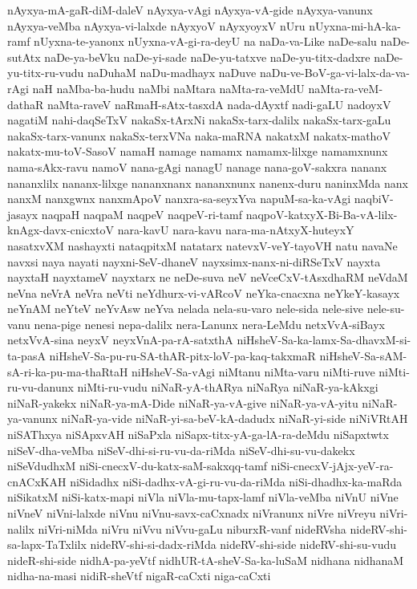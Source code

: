 {nAyxya-mA-gaR-diM-daleV
nAyxya-vAgi
nAyxya-vA-gide
nAyxya-vanunx
nAyxya-veMba
nAyxya-vi-lalxde
nAyxyoV
nAyxyoyxV
nUru
nUyxna-mi-hA-ka-ramf
nUyxna-te-yanonx
nUyxna-vA-gi-ra-deyU
na
naDa-va-Like
naDe-salu
naDe-sutAtx
naDe-ya-beVku
naDe-yi-sade
naDe-yu-tatxve
naDe-yu-titx-dadxre
naDe-yu-titx-ru-vudu
naDuhaM
naDu-madhayx
naDuve
naDu-ve-BoV-ga-vi-lalx-da-va-rAgi
naH
naMba-ba-hudu
naMbi
naMtara
naMta-ra-veMdU
naMta-ra-veM-dathaR
naMta-raveV
naRmaH-sAtx-tasxdA
nada-dAyxtf
nadi-gaLU
nadoyxV
nagatiM
nahi-daqSeTxV
nakaSx-tArxNi
nakaSx-tarx-dalilx
nakaSx-tarx-gaLu
nakaSx-tarx-vanunx
nakaSx-terxVNa
naka-maRNA
nakatxM
nakatx-mathoV
nakatx-mu-toV-SasoV
namaH
namage
namamx
namamx-lilxge
namamxnunx
nama-sAkx-ravu
namoV
nana-gAgi
nanagU
nanage
nana-goV-sakxra
nananx
nananxlilx
nananx-lilxge
nananxnanx
nananxnunx
nanenx-duru
naninxMda
nanx
nanxM
nanxgwnx
nanxmApoV
nanxra-sa-seyxYva
napuM-sa-ka-vAgi
naqbiV-jasayx
naqpaH
naqpaM
naqpeV
naqpeV-ri-tamf
naqpoV-katxyX-Bi-Ba-vA-lilx-knAgx-davx-cnicxtoV
nara-kavU
nara-kavu
nara-ma-nAtxyX-huteyxY
nasatxvXM
nashayxti
nataqpitxM
natatarx
natevxV-veY-tayoVH
natu
navaNe
navxsi
naya
nayati
nayxni-SeV-dhaneV
nayxsimx-nanx-ni-diRSeTxV
nayxta
nayxtaH
nayxtameV
nayxtarx
ne
neDe-suva
neV
neVceCxV-tAsxdhaRM
neVdaM
neVna
neVrA
neVra
neVti
neYdhurx-vi-vARcoV
neYka-cnacxna
neYkeY-kasayx
neYnAM
neYteV
neYvAsw
neYva
nelada
nela-su-varo
nele-sida
nele-sive
nele-su-vanu
nena-pige
nenesi
nepa-dalilx
nera-Lanunx
nera-LeMdu
netxVvA-siBayx
netxVvA-sina
neyxV
neyxVnA-pa-rA-satxthA
niHsheV-Sa-ka-lamx-Sa-dhavxM-si-ta-pasA
niHsheV-Sa-pu-ru-SA-thAR-pitx-loV-pa-kaq-takxmaR
niHsheV-Sa-sAM-sA-ri-ka-pu-ma-thaRtaH
niHsheV-Sa-vAgi
niMtanu
niMta-varu
niMti-ruve
niMti-ru-vu-danunx
niMti-ru-vudu
niNaR-yA-thARya
niNaRya
niNaR-ya-kAkxgi
niNaR-yakekx
niNaR-ya-mA-Dide
niNaR-ya-vA-give
niNaR-ya-vA-yitu
niNaR-ya-vanunx
niNaR-ya-vide
niNaR-yi-sa-beV-kA-dadudx
niNaR-yi-side
niNiVRtAH
niSAThxya
niSApxvAH
niSaPxla
niSapx-titx-yA-ga-lA-ra-deMdu
niSapxtwtx
niSeV-dha-veMba
niSeV-dhi-si-ru-vu-da-riMda
niSeV-dhi-su-vu-dakekx
niSeVdudhxM
niSi-cnecxV-du-katx-saM-sakxqq-tamf
niSi-cnecxV-jAjx-yeV-ra-cnACxKAH
niSidadhx
niSi-dadhx-vA-gi-ru-vu-da-riMda
niSi-dhadhx-ka-maRda
niSikatxM
niSi-katx-mapi
niVla
niVla-mu-tapx-lamf
niVla-veMba
niVnU
niVne
niVneV
niVni-lalxde
niVnu
niVnu-savx-caCxnadx
niVranunx
niVre
niVreyu
niVri-nalilx
niVri-niMda
niVru
niVvu
niVvu-gaLu
niburxR-vanf
nideRVsha
nideRV-shi-sa-lapx-TaTxlilx
nideRV-shi-si-dadx-riMda
nideRV-shi-side
nideRV-shi-su-vudu
nideR-shi-side
nidhA-pa-yeVtf
nidhUR-tA-sheV-Sa-ka-luSaM
nidhana
nidhanaM
nidha-na-masi
nidiR-sheVtf
nigaR-caCxti
niga-caCxti
}

